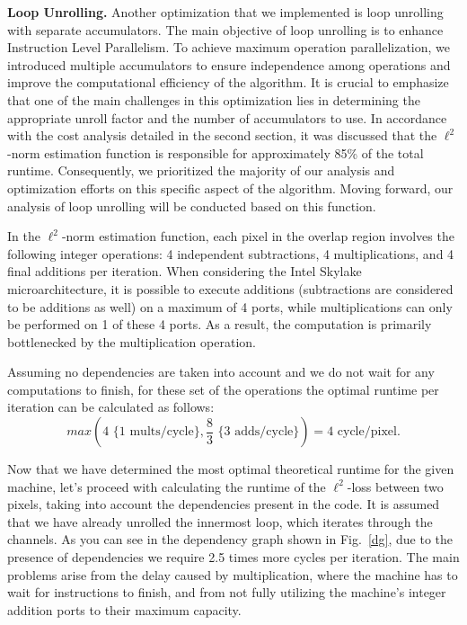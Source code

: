 \documentclass[letterpaper]{article}
\newcommand{\mypar}[1]{{\bf #1.}}
\begin{document}
\mypar{Loop Unrolling} 
Another optimization that we implemented is loop unrolling with separate accumulators. The main objective of loop unrolling is to enhance Instruction Level Parallelism. To achieve maximum operation parallelization, we introduced multiple accumulators to ensure independence among operations and improve the computational efficiency of the algorithm. It is crucial to emphasize that one of the main challenges in this optimization lies in determining the appropriate unroll factor and the number of accumulators to use. 
In accordance with the cost analysis detailed in the second section, it was discussed that the $\ell^2$-norm estimation function is responsible for approximately 85\% of the total runtime. Consequently, we prioritized the majority of our analysis and optimization efforts on this specific aspect of the algorithm. Moving forward, our analysis of loop unrolling will be conducted based on this function.

In the $\ell^2$-norm estimation function, each pixel in the overlap region involves the following integer operations: 4 independent subtractions, 4 multiplications, and 4 final additions per iteration. When considering the Intel Skylake microarchitecture, it is possible to execute additions (subtractions are considered to be additions as well) on a maximum of 4 ports, while multiplications can only be performed on 1 of these 4 ports. As a result, the computation is primarily bottlenecked by the multiplication operation.

Assuming no dependencies are taken into account and we do not wait for any computations to finish, for these set of the operations the optimal runtime per iteration can be calculated as follows:
\[ max(4 \text{ \{1 mults/cycle\}}, \frac{8}{3} \text{ \{3 adds/cycle\}}) = 4 \text{ cycle/pixel}. \]

Now that we have determined the most optimal theoretical runtime for the given machine, let's proceed with calculating the runtime of the $\ell^2$-loss between two pixels, taking into account the dependencies present in the code. It is assumed that we have already unrolled the innermost loop, which iterates through the channels. As you can see in the dependency graph shown in Fig.~\ref{dg}, due to the presence of dependencies we require 2.5 times more cycles per iteration. The main problems arise from the delay caused by multiplication, where the machine has to wait for instructions to finish, and from not fully utilizing the machine's integer addition ports to their maximum capacity.
\end{document}

